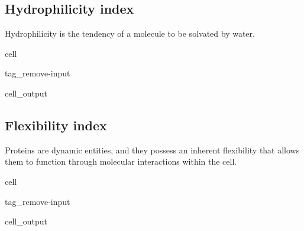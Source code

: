 \documentclass[letterpaper,10pt,english]{jupyterBook}
\begin{document}
\subsection{Hydrophilicity index}
\label{\detokenize{ipynb/chapter1:hydrophilicity-index}}
\sphinxAtStartPar
Hydrophilicity is the tendency of a molecule to be solvated by water.

\begin{sphinxuseclass}{cell}
\begin{sphinxuseclass}{tag_remove-input}\begin{sphinxVerbatimOutput}

\begin{sphinxuseclass}{cell_output}
\noindent{}

\end{sphinxuseclass}\end{sphinxVerbatimOutput}

\end{sphinxuseclass}
\end{sphinxuseclass}

\subsection{Flexibility index}
\label{\detokenize{ipynb/chapter1:flexibility-index}}
\sphinxAtStartPar
Proteins are dynamic entities, and they possess an inherent flexibility that allows them to function through molecular interactions within the cell.

\begin{sphinxuseclass}{cell}
\begin{sphinxuseclass}{tag_remove-input}\begin{sphinxVerbatimOutput}

\begin{sphinxuseclass}{cell_output}
\noindent{}

\end{sphinxuseclass}\end{sphinxVerbatimOutput}

\end{sphinxuseclass}
\end{sphinxuseclass}
\end{document}
